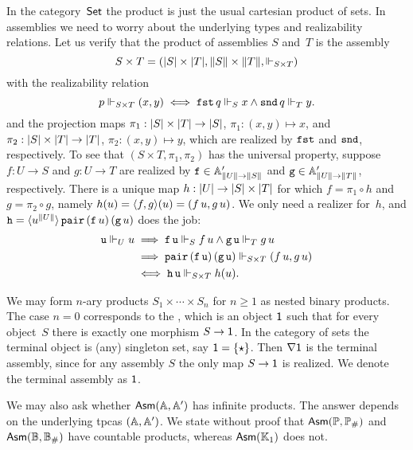 In the category~$\Set$ the product is just the usual cartesian product
of sets. In assemblies we need to worry about the underlying types and
realizability relations. Let us verify that the product of assemblies
$S$ and~$T$ is the assembly
%
\begin{equation*}
  S \times T =
  (\S{S} \times \S{T}, \T{S} \times \T{T}, {\rz[S \times T]})
\end{equation*}
%
with the realizability relation
%
\begin{equation*}
  p \rz[S \times T] (x,y)
  \iff
  \combFst\,q \rz[S] x
  \land
  \combSnd\,q \rz[T] y.
\end{equation*}
%
and the projection maps $\pi_1 : \S{S} \times \S{T} \to \S{S}$, $\pi_1 : (x,y)
\mapsto x$, and $\pi_2 : \S{S} \times \S{T} \to \S{T}$, $\pi_2 : (x,y) \mapsto y$,
which are realized by $\combFst$ and $\combSnd$, respectively.
%
To see that $(S \times T, \pi_1, \pi_2)$ has the universal
property, suppose $f : U \to S$ and $g : U \to
T$ are realized by $\R{f} \in \subAtyp{\T{U} \to \T{S}}$ and $\R{g}
\in \subAtyp{\T{U} \to \T{T}}$, respectively. There is a unique map $h :
\S{U} \to \S{S} \times \S{T}$ for which $f = \pi_1 \circ h$ and $g = \pi_2 \circ g$,
namely $h(u) = \pair{f,g}(u) = (f\,u, g\,u)$. We only need a realizer
for~$h$, and $\R{h} =
\tpcalam{u}{\T{U}}{\combPair\,(\R{f}\,u)\,(\R{g}\,u)}$ does the
job:
%
\begin{align*}
  \R{u} \rz[U] u
  &\implies
  \R{f}\,\R{u} \rz[S] f\,u
  \land
  \R{g}\,\R{u} \rz[T] g\,u \\
  &\implies
  \combPair\, (\R{f}\,\R{u})\, (\R{g}\,\R{u}) \rz[S \times T] (f\,u, g\,u) \\
  &\iff
  \R{h}\,\R{u} \rz[S \times T] h(u).
\end{align*}

We may form $n$-ary products $S_1 \times \cdots \times S_n$ for $n \geq 1$ as nested binary products. The case $n = 0$ corresponds to the ,
which is an object $\one$ such that for every object~$S$ there is exactly one morphism $S \to \one$. In the category of sets the terminal object is (any) singleton set, say $\one = \set{\star}$. Then $\nabla \one$ is the terminal assembly, since for any assembly
$S$ the only map $S \to \one$ is realized. We denote the terminal assembly as $\one$.

We may also ask whether $\AsmA$ has infinite products. The answer depends on the underlying tpcas $(\AA, \subAA)$. We state without proof that $\Asm{\Scott, \comp{\Scott}}$ and $\Asm{\Baire, \comp{\Baire}}$ have countable products, whereas $\Asm{\klone}$ does not.

